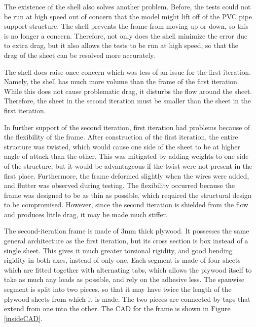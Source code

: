 \documentclass[12pt]{report} %
\begin{document}
The existence of the shell also solves another problem. Before, the tests could not be run at high speed out of concern
that the model might lift off of the PVC pipe support structure. The shell prevents the frame from moving up or down,
so this is no longer a concern. Therefore, not only does the shell minimize the error due to extra drag, but it also allows
the tests to be run at high speed, so that the drag of the sheet can be resolved more accurately.

The shell does raise once concern which was less of an issue for the first iteration. Namely, the shell has much more volume
than the frame of the first iteration. While this does not cause problematic drag, it disturbs the flow around the sheet.
Therefore, the sheet in the second iteration must be smaller than the sheet in the first iteration.

In further support of the second iteration, first iteration had problems because of the flexibility of the frame. After
construction of the first iteration, the entire structure was twisted, which would cause one side of the sheet to be at higher
angle of attack than the other. This was mitigated by adding weights to one side of the structure, but it would be advantageous
if the twist were not present in the first place. Furthermore, the frame deformed slightly when the wires were added, and
flutter was observed during testing. The flexibility occurred because the frame was designed to be as thin as possible, which
required the structural design to be compromised. However, since the second iteration is shielded from the flow and produces
little drag, it may be made much stiffer.

The second-iteration frame is made of 3mm thick plywood. It possesses the same general architecture as the first iteration,
but its cross section is box instead of a single sheet. This gives it much greater torsional rigidity, and good bending
rigidity in both axes, instead of only one. Each segment is made of four sheets which are fitted together with alternating
tabs, which allows the plywood itself to take as much any loads as possible, and rely on the adhesive less. The spanwise
segment is split into two pieces, so that it may have twice the length of the plywood sheets from which it is made. The two
pieces are connected by taps that extend from one into the other. The CAD for
the frame is shown in Figure \ref{insideCAD}.
\end{document}
